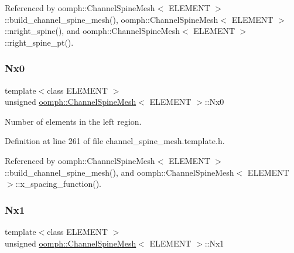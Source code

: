 Referenced by oomph\+::\+Channel\+Spine\+Mesh$<$ E\+L\+E\+M\+E\+N\+T $>$\+::build\+\_\+channel\+\_\+spine\+\_\+mesh(), oomph\+::\+Channel\+Spine\+Mesh$<$ E\+L\+E\+M\+E\+N\+T $>$\+::nright\+\_\+spine(), and oomph\+::\+Channel\+Spine\+Mesh$<$ E\+L\+E\+M\+E\+N\+T $>$\+::right\+\_\+spine\+\_\+pt().

\mbox{\label{classoomph_1_1ChannelSpineMesh_a283ffaeb501cec43df629d3bf06fe3d2}} 
\subsubsection{\texorpdfstring{Nx0}{Nx0}}
{\footnotesize\ttfamily template$<$class E\+L\+E\+M\+E\+NT $>$ \\
unsigned \hyperlink{classoomph_1_1ChannelSpineMesh}{oomph\+::\+Channel\+Spine\+Mesh}$<$ E\+L\+E\+M\+E\+NT $>$\+::Nx0\hspace{0.3cm}{\ttfamily [protected]}}



Number of elements in the left region. 



Definition at line 261 of file channel\+\_\+spine\+\_\+mesh.\+template.\+h.



Referenced by oomph\+::\+Channel\+Spine\+Mesh$<$ E\+L\+E\+M\+E\+N\+T $>$\+::build\+\_\+channel\+\_\+spine\+\_\+mesh(), and oomph\+::\+Channel\+Spine\+Mesh$<$ E\+L\+E\+M\+E\+N\+T $>$\+::x\+\_\+spacing\+\_\+function().

\mbox{\label{classoomph_1_1ChannelSpineMesh_a678cfaebcb1c7a31027188af36be9e7b}} 
\subsubsection{\texorpdfstring{Nx1}{Nx1}}
{\footnotesize\ttfamily template$<$class E\+L\+E\+M\+E\+NT $>$ \\
unsigned \hyperlink{classoomph_1_1ChannelSpineMesh}{oomph\+::\+Channel\+Spine\+Mesh}$<$ E\+L\+E\+M\+E\+NT $>$\+::Nx1\hspace{0.3cm}{\ttfamily [protected]}}



